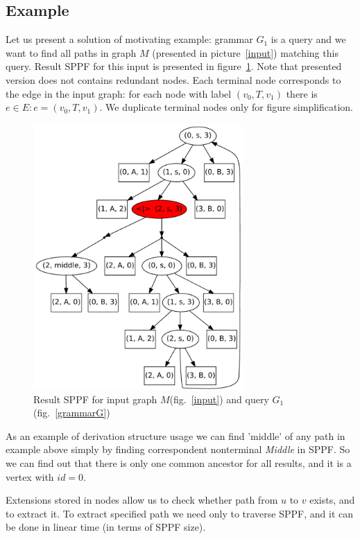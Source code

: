 \subsection{Example}

Let us present a solution of motivating example: grammar $G_1$ is a query and we want to find all paths in graph $M$ (presented in picture~\ref{input}) matching this query.
Result SPPF for this input is presented in figure~\ref{SPPF}. Note that presented version does not contains redundant nodes.
Each terminal node corresponds to the edge in the input graph: for each node with label $(v_0, T, v_1)$ there is $e\in E: e=(v_0,T,v_1)$.
We duplicate terminal nodes only for figure simplification.

\begin{figure}[h]
    \begin{center}
        \includegraphics[width=8cm]{dot/AnBn.pdf}
        \caption{Result SPPF for input graph $M$(fig.~\ref{input}) and query $G_1$(fig.~\ref{grammarG})}
        \label{SPPF}        
    \end{center}
\end{figure}

    
As an example of derivation structure usage we can find 'middle' of any path in example above simply by finding correspondent nonterminal \textit{Middle} in SPPF.
So we can find out that there is only one common ancestor for all results, and it is a vertex with $id = 0$. 

Extensions stored in nodes allow us to check whether path from $u$ to $v$ exists, and to extract it. 
To extract specified path we need only to traverse SPPF, and it can be done in linear time (in terms of SPPF size). 

